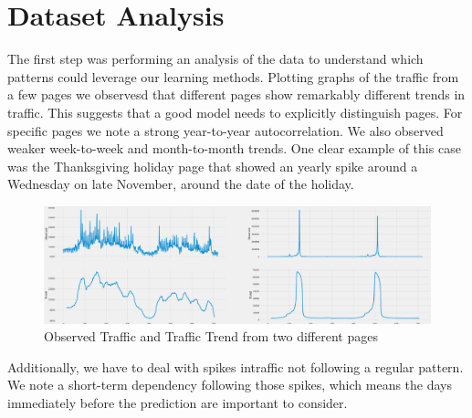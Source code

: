 \section{Dataset Analysis}
The first step was performing an analysis of the data to understand which patterns could leverage our learning methods. Plotting graphs of the traffic from a few pages we observesd that different pages show remarkably different trends in traffic. This suggests that a good model needs to explicitly distinguish pages.
For specific pages we note a strong year-to-year autocorrelation. We also observed weaker week-to-week and month-to-month trends. One clear example of this case was the Thanksgiving holiday page that showed an yearly spike around a Wednesday on late November, around the date of the holiday.

\begin{figure}[h!]
  \includegraphics[width=\linewidth]{analysis1.png}
  \caption{Observed Traffic and Traffic Trend from two different pages}
  \label{fig:analysis1}
\end{figure}

Additionally, we have to deal with spikes intraffic not following a regular pattern. We note a short-term dependency following those spikes, which means the days immediately before the prediction are important to consider.


